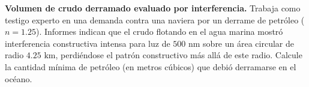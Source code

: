 \item \textbf{Volumen de crudo derramado evaluado por interferencia.}
Trabaja como testigo experto en una demanda contra una naviera por un derrame de petróleo ($n = 1.25$). Informes indican que el crudo flotando en el agua marina mostró interferencia constructiva intensa para luz de $500\text{ nm}$ sobre un área circular de radio $4.25\text{ km}$, perdiéndose el patrón constructivo más allá de este radio. Calcule la cantidad mínima de petróleo (en metros cúbicos) que debió derramarse en el océano.